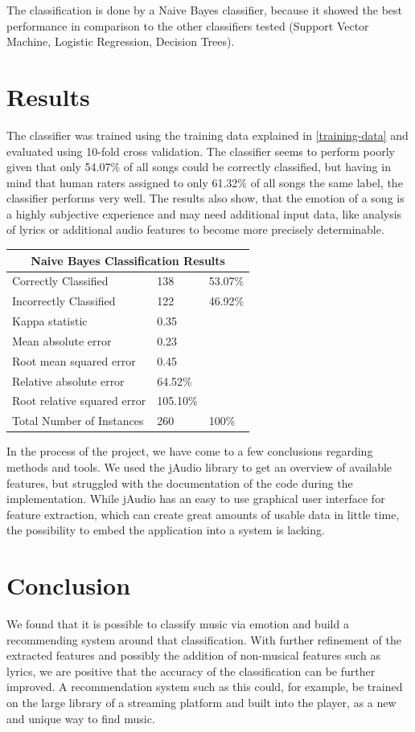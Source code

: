 \documentclass{sigchi-ext}
\begin{document}
The classification is done by a Naive Bayes classifier, because it showed the best performance in comparison to the other classifiers tested (Support Vector Machine, Logistic Regression, Decision Trees).

\section{Results}
The classifier was trained using the training data explained in \ref{training-data} and evaluated using 10-fold cross validation. The classifier seems to perform poorly given that only 54.07\% of all songs could be correctly classified, but having in mind that human raters assigned to only 61.32\% of all songs the same label, the classifier performs very well. The results also show, that the emotion of a song is a highly subjective experience and may need additional input data, like analysis of lyrics or additional audio features to become more precisely determinable.

\begin{table}
  \centering
\begin{tabular}{@{}lll@{}}
\multicolumn{3}{c}{\textbf{Naive Bayes Classification Results}} \\ \midrule
Correctly Classified             & 138      & 53.07\% \\
Incorrectly Classified           & 122      & 46.92\% \\
Kappa statistic 				 & 0.35     & \\
Mean absolute error  			 & 0.23     & \\
Root mean squared error 		 & 0.45     & \\
Relative absolute error 		 & 64.52\%  & \\
Root relative squared error 	 & 105.10\% & \\
Total Number of Instances 		 & 260      & 100\%
\end{tabular}
\end{table}

In the process of the project, we have come to a few conclusions regarding methods and tools. We used the jAudio library to get an overview of available features, but struggled with the documentation of the code during the implementation. While jAudio has an easy to use graphical user interface for feature extraction, which can create great amounts of usable data in little time, the possibility to embed the application into a system is lacking.

\section{Conclusion}
We found that it is possible to classify music via emotion and build a recommending system around that classification. With further refinement of the extracted features and possibly the addition of non-musical features such as lyrics, we are positive that the accuracy of the classification can be further improved. A recommendation system such as this could, for example, be trained on the large library of a streaming platform and built into the player, as a new and unique way to find music.



\end{document}
